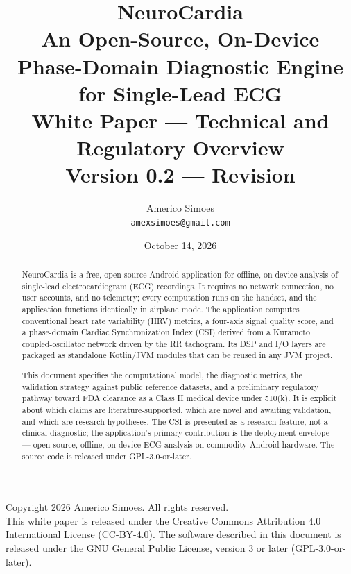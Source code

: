 \documentclass[11pt]{article}
\title{\textbf{NeuroCardia}\\[4pt]
\large An Open-Source, On-Device Phase-Domain Diagnostic Engine for
Single-Lead ECG\\[4pt]
\normalsize White Paper --- Technical and Regulatory Overview\\[2pt]
\small Version 0.2 --- Revision}
\author{Americo Simoes \\ \texttt{amexsimoes@gmail.com}}
\date{October 14, 2026}
\begin{document}
\maketitle

\begin{center}
\small
Copyright \textcopyright{} 2026 Americo Simoes. All rights reserved.\\
This white paper is released under the Creative Commons Attribution 4.0
International License (CC-BY-4.0). The software described in this
document is released under the GNU General Public License, version 3 or
later (GPL-3.0-or-later).
\end{center}

\vspace{1em}
\noindent{}

\vspace{1em}

\begin{abstract}
NeuroCardia is a free, open-source Android application for offline,
on-device analysis of single-lead electrocardiogram (ECG) recordings.
It requires no network connection, no user accounts, and no telemetry;
every computation runs on the handset, and the application functions
identically in airplane mode. The application computes conventional
heart rate variability (HRV) metrics, a four-axis signal quality score,
and a phase-domain Cardiac Synchronization Index (CSI) derived from a
Kuramoto coupled-oscillator network driven by the RR tachogram. Its DSP
and I/O layers are packaged as standalone Kotlin/JVM modules that can be
reused in any JVM project.

This document specifies the computational model, the diagnostic
metrics, the validation strategy against public reference datasets, and
a preliminary regulatory pathway toward FDA clearance as a Class II
medical device under 510(k). It is explicit about which claims are
literature-supported, which are novel and awaiting validation, and
which are research hypotheses. The CSI is presented as a research
feature, not a clinical diagnostic; the application's primary
contribution is the deployment envelope --- open-source, offline,
on-device ECG analysis on commodity Android hardware. The source code
is released under GPL-3.0-or-later.
\end{abstract}
\end{document}

